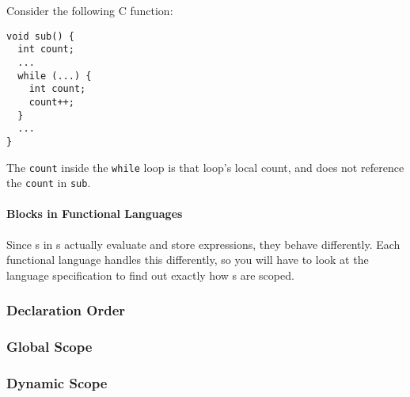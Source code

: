 Consider the following C function:
\begin{verbatim}
void sub() {
  int count;
  ...
  while (...) {
    int count;
    count++;
  }
  ...
}
\end{verbatim}
The \texttt{count} inside the \texttt{while} loop is that loop's local count, and does not reference the \texttt{count} in \texttt{sub}.

\paragraph{Blocks in Functional Languages}\label{par:Variable_Block_in_Functional_Languages}
Since s in s actually evaluate and store expressions, they behave differently.
Each functional language handles this differently, so you will have to look at the language specification to find out exactly how s are scoped.

\subsubsection{Declaration Order}\label{subsubsec:Variable_Declaration_Order}
\subsubsection{Global Scope}\label{subsubsec:Variable_Global_Scope}
\subsubsection{Dynamic Scope}\label{subsubsec:Dynamic_Scope}

